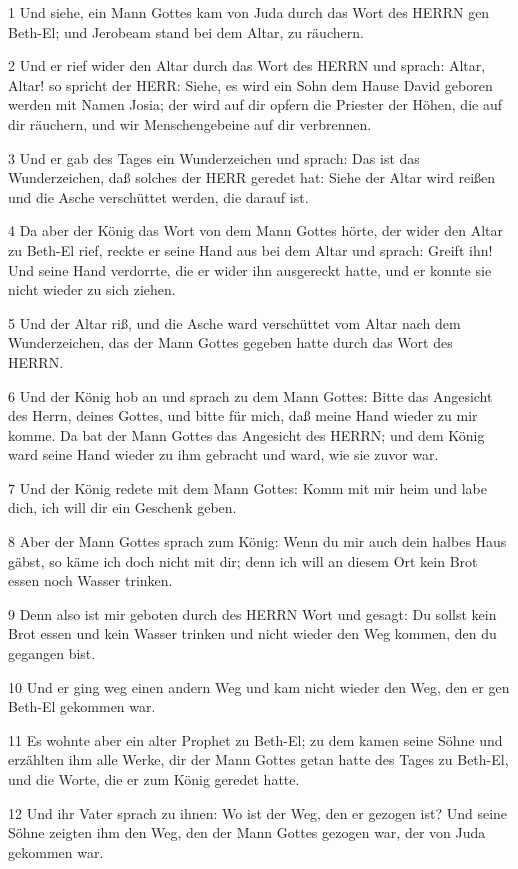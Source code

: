 \par 1 Und siehe, ein Mann Gottes kam von Juda durch das Wort des HERRN gen Beth-El; und Jerobeam stand bei dem Altar, zu räuchern.
\par 2 Und er rief wider den Altar durch das Wort des HERRN und sprach: Altar, Altar! so spricht der HERR: Siehe, es wird ein Sohn dem Hause David geboren werden mit Namen Josia; der wird auf dir opfern die Priester der Höhen, die auf dir räuchern, und wir Menschengebeine auf dir verbrennen.
\par 3 Und er gab des Tages ein Wunderzeichen und sprach: Das ist das Wunderzeichen, daß solches der HERR geredet hat: Siehe der Altar wird reißen und die Asche verschüttet werden, die darauf ist.
\par 4 Da aber der König das Wort von dem Mann Gottes hörte, der wider den Altar zu Beth-El rief, reckte er seine Hand aus bei dem Altar und sprach: Greift ihn! Und seine Hand verdorrte, die er wider ihn ausgereckt hatte, und er konnte sie nicht wieder zu sich ziehen.
\par 5 Und der Altar riß, und die Asche ward verschüttet vom Altar nach dem Wunderzeichen, das der Mann Gottes gegeben hatte durch das Wort des HERRN.
\par 6 Und der König hob an und sprach zu dem Mann Gottes: Bitte das Angesicht des Herrn, deines Gottes, und bitte für mich, daß meine Hand wieder zu mir komme. Da bat der Mann Gottes das Angesicht des HERRN; und dem König ward seine Hand wieder zu ihm gebracht und ward, wie sie zuvor war.
\par 7 Und der König redete mit dem Mann Gottes: Komm mit mir heim und labe dich, ich will dir ein Geschenk geben.
\par 8 Aber der Mann Gottes sprach zum König: Wenn du mir auch dein halbes Haus gäbst, so käme ich doch nicht mit dir; denn ich will an diesem Ort kein Brot essen noch Wasser trinken.
\par 9 Denn also ist mir geboten durch des HERRN Wort und gesagt: Du sollst kein Brot essen und kein Wasser trinken und nicht wieder den Weg kommen, den du gegangen bist.
\par 10 Und er ging weg einen andern Weg und kam nicht wieder den Weg, den er gen Beth-El gekommen war.
\par 11 Es wohnte aber ein alter Prophet zu Beth-El; zu dem kamen seine Söhne und erzählten ihm alle Werke, dir der Mann Gottes getan hatte des Tages zu Beth-El, und die Worte, die er zum König geredet hatte.
\par 12 Und ihr Vater sprach zu ihnen: Wo ist der Weg, den er gezogen ist? Und seine Söhne zeigten ihm den Weg, den der Mann Gottes gezogen war, der von Juda gekommen war.
